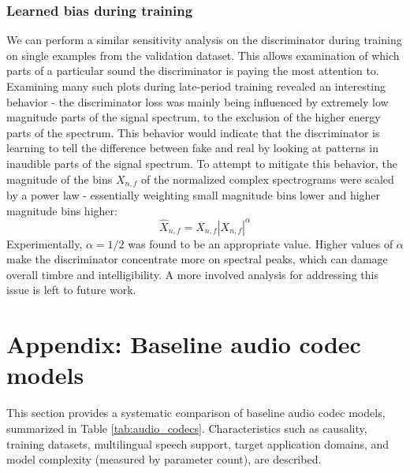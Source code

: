 \documentclass{article} %
\begin{document}
\subsubsection{Learned bias during training}

We can perform a similar sensitivity analysis on the discriminator during training on single examples from the validation dataset. This allows examination of which parts of a particular sound the discriminator is paying the most attention to. Examining many such plots during late-period training revealed an interesting behavior - the discriminator loss was mainly being influenced by extremely low magnitude parts of the signal spectrum, to the exclusion of the higher energy parts of the spectrum. This behavior would indicate that the discriminator is learning to tell the difference between fake and real by looking at patterns in inaudible parts of the signal spectrum. To attempt to mitigate this behavior, the magnitude of the bins $X_{n,f}$ of the normalized complex spectrograms were scaled by a power law - essentially weighting small magnitude bins lower and higher magnitude bins higher:
\begin{equation}
 \hat{X}_{n,f}= X_{n,f} |X_{n,f}|^\alpha
\end{equation}
Experimentally, $\alpha = 1/2$ was found to be an appropriate value. Higher values of $\alpha$ make the discriminator concentrate more on spectral peaks, which can damage overall timbre and intelligibility. A more involved analysis for addressing this issue is left to future work.

\vspace{1em}
\section{Appendix: Baseline audio codec models}
This section provides a systematic comparison of baseline audio codec models, summarized in Table \ref{tab:audio_codecs}. Characteristics such as causality, training datasets, multilingual speech support, target application domains, and model complexity (measured by parameter count), are described. 
\end{document}
